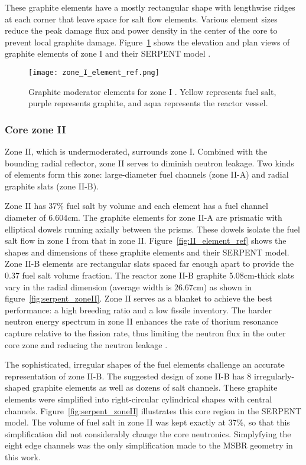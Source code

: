 These graphite elements have a mostly rectangular shape with lengthwise ridges 
at each corner that leave space for salt flow elements. Various element sizes 
reduce the peak damage flux and power density in the center of the core to 
prevent local graphite damage.  Figure~\ref{fig:I_element_ref} shows the 
elevation and plan views of graphite elements of zone I 
\cite{robertson_conceptual_1971} and their SERPENT model 
\cite{rykhlevskii_full-core_2017}.

\begin{figure}[ht!] %
  \texttt{[image: zone\_I\_element\_ref.png]}
  \caption{Graphite moderator elements for zone I 
  \cite{robertson_conceptual_1971,rykhlevskii_full-core_2017}.  Yellow 
  represents fuel salt, purple represents graphite, and aqua represents the 
  reactor vessel.}
  \label{fig:I_element_ref}
\end{figure}

\subsubsection{Core zone II}
Zone II, which is undermoderated, surrounds zone I. Combined with the bounding 
radial reflector, zone II serves to diminish neutron leakage. Two kinds of 
elements form this zone: large-diameter fuel channels (zone II-A) and 
radial graphite slats (zone II-B). 

Zone II has 37\% fuel salt by volume and each element has a fuel channel 
diameter of 6.604cm. The graphite elements for zone II-A are prismatic with
elliptical dowels running axially between the prisms. These dowels
isolate the fuel salt flow in zone I from that in zone II. 
Figure~\ref{fig:II_element_ref} shows the shapes and dimensions of these graphite 
elements and their SERPENT model. Zone II-B elements are rectangular slats 
spaced far enough apart to provide the 0.37 fuel salt volume fraction. The 
reactor zone II-B graphite 5.08cm-thick slats vary in the radial dimension 
(average width is 26.67cm) as shown in figure~\ref{fig:serpent_zoneII}. Zone II 
serves as a blanket to achieve the best performance: a high breeding ratio and 
a low fissile inventory. The harder neutron energy spectrum in zone II 
enhances the rate of thorium resonance capture relative to the fission rate, 
thus limiting the neutron flux in the outer core zone and reducing the neutron 
leakage \cite{robertson_conceptual_1971}. 

The sophisticated, irregular shapes of the fuel elements challenge an accurate 
representation of zone II-B.  
The suggested design \cite{robertson_conceptual_1971} of zone II-B has 8 
irregularly-shaped graphite elements as well as dozens of salt channels. 
These graphite elements were simplified into right-circular cylindrical shapes  
with central channels. Figure~\ref{fig:serpent_zoneII} illustrates this core 
region in the SERPENT model. The volume of fuel salt in zone II was kept 
exactly at 37\%, so that this simplification did not considerably change the core 
neutronics. Simplyfying the eight edge channels was the only simplification made 
to the \gls{MSBR} geometry in this work. 

